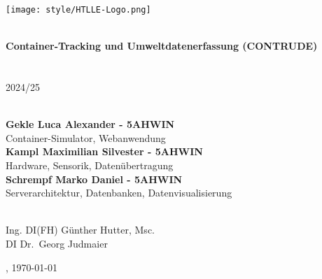 \documentclass[
    headings=optiontotocandhead,%
    twoside,
    numbers=noenddot,%
    12pt, %
    titlepage, %
    parskip=full, %
    listof=leveldown, 
    numbers=noenddot, %
    a4paper,DIV=14,
    BCOR=15mm,
]{scrbook}
\begin{document}
\frontmatter %
\title{}
\begin{titlepage}

\begin{center}

\texttt{[image: style/HTLLE-Logo.png]}

\vspace{2cm}
\textbf{\LARGE{}}{\large{}}\\
{\large{}\vspace{15mm}
 \textbf{\large{}
Container-Tracking und Umweltdatenerfassung (CONTRUDE)
}\\

 \vspace{15mm}
  \\
  \\
 \vspace{1cm}
2024/25
\\
 \vspace{1cm}
 \\
 \vspace{0.5cm}
}

\textbf{Gekle Luca Alexander - 5AHWIN} \\ 
Container-Simulator, Webanwendung
\vspace{5mm}
\\ \textbf{Kampl Maximilian Silvester - 5AHWIN} \\ 
Hardware, Sensorik, Datenübertragung
\vspace{5mm}
\\ \textbf{Schrempf Marko Daniel - 5AHWIN} \\ 
Serverarchitektur, Datenbanken, Datenvisualisierung
\vspace{5mm}


\par\end{center}{\large \par}

\begin{center}
 \normalsize {} \\
 \vspace{0.5cm}
Ing. DI(FH) Günther Hutter, Msc.\\ DI Dr.~Georg Judmaier

\par\end{center}

\begin{center}
\vspace{5mm}
, \today 
\par\end{center}
\end{titlepage}
\end{document}
